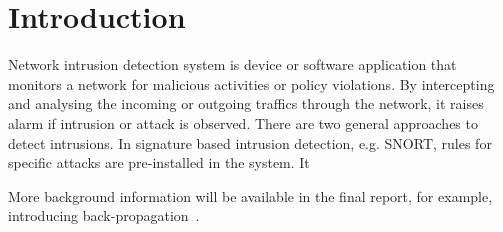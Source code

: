 \section{Introduction}

Network intrusion detection system is device or software application that monitors a network
for malicious activities or policy violations.
By intercepting and analysing the incoming or outgoing traffics through the network,
it raises alarm if intrusion or attack is observed.
There are two general approaches to detect intrusions.
In signature based intrusion detection, e.g. SNORT, rules for specific attacks
are pre-installed in the system.
It 


More background information will be available in the final report,
for example, introducing back-propagation~\cite{Backpropagation}.

